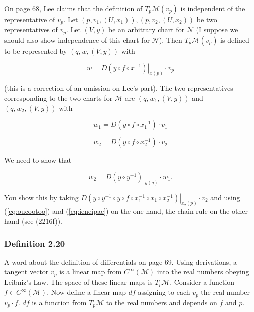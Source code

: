 \documentclass[12pt]{article}
\begin{document}
On page 68, Lee claims that the definition of
$T_{p}\mathcal{M}(v_{p})$ is independent of the representative of
$v_{p}$. Let $(p,v_{1},(U,x_{1})),(p,v_{2},(U,x_{2}))$ be two
representatives of $v_{p}$. Let $(V,y)$ be an arbitrary chart for
$\mathcal{N}$ (I suppose we should also show independence of this
chart for $\mathcal{N}$). Then $T_{p}\mathcal{M}(v_{p})$ is defined to
be represented by $(q,w,(V,y))$ with

\begin{equation}
  \label{eq:aexapief}
  w=\left.{}D(y\circ{}f\circ{}x^{-1})\right\vert_{x(p)}\cdot{}v_{p}
\end{equation}

(this is a correction of an omission on Lee's part). The two
representatives corresponding to the two charts for $\mathcal{M}$ are
$(q,w_{1},(V,y))$ and $(q,w_{2},(V,y))$ with 

\begin{equation}
  \label{eq:oucootoo}
w_{1}=D(y\circ{}f\circ{}x_{1}^{-1})\cdot{}v_{1}
\end{equation}

\begin{equation}
  \label{eq:ieneipae}
w_{2}=D(y\circ{}f\circ{}x_{2}^{-1})\cdot{}v_{2}
\end{equation}

We need to show that

\begin{equation}
  \label{eq:chuaphoo}
  w_{2}=\left.D(y\circ{}y^{-1})\right\vert_{y(q)}\cdot{}w_{1}.
\end{equation}

You show this by taking
$\left.{}D(y\circ{}y^{-1}\circ{}y\circ{}f\circ{}x_{1}^{-1}\circ{}x_{1}\circ{}x_{2}^{-1})\right\vert_{x_{2}(p)}\cdot{}v_{2}$
and using (\ref{eq:oucootoo}) and (\ref{eq:ieneipae}) on the one hand,
the chain rule on the other hand (see (2216f)).

\subsubsection{Definition 2.20}
\label{subsubsection:queceixo}

A word about the definition of differentials on page 69. Using
derivations, a tangent vector $v_{p}$ is a linear map from
$C^{\infty}(\mathcal{M})$ into the real numbers obeying Leibniz's Law.
The space of these linear maps is $T_{p}\mathcal{M}$. Consider a
function $f\in{}C^{\infty}(\mathcal{M})$. Now define a linear map $df$
assigning to each $v_{p}$ the real number $v_{p}\cdot{}f$. $df$ is a
function from $T_{p}\mathcal{M}$ to the real numbers and depends on
$f$ and $p$. 
\end{document}
